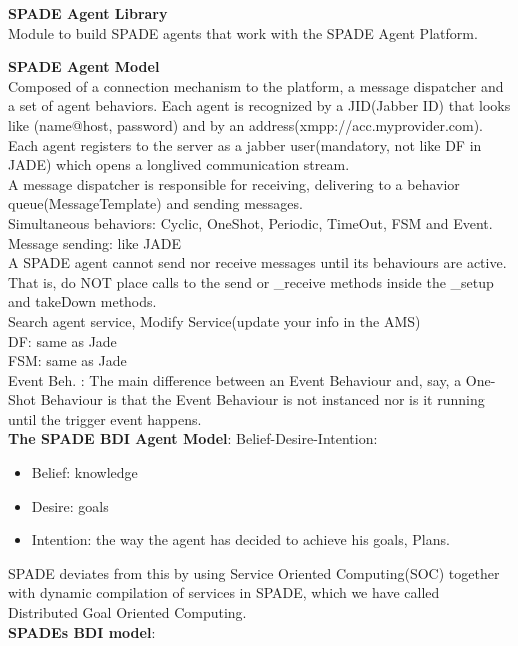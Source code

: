 \documentclass[a4paper, 11pt]{article}
\begin{document}
\textbf{SPADE Agent Library}\\
Module to build SPADE agents that work with the SPADE Agent Platform.

\textbf{SPADE Agent Model}\\
Composed of a connection mechanism to the platform, a message dispatcher and a set of agent behaviors. Each agent is recognized by a JID(Jabber ID) that looks like (name@host, password) and by an address(xmpp://acc.myprovider.com). Each agent registers to the server as a jabber user(mandatory, not like DF in JADE) which opens a longlived communication stream. \\
A message dispatcher is responsible for receiving, delivering to a behavior queue(MessageTemplate) and sending messages. \\
Simultaneous behaviors: Cyclic, OneShot, Periodic, TimeOut, FSM and Event. \\
Message sending: like JADE \\
A SPADE agent cannot send nor receive messages until its behaviours are active. That is, do NOT place calls to the send or \_receive methods inside the \_setup and takeDown methods. \\
Search agent service, Modify Service(update your info in the AMS) \\
DF: same as Jade \\
FSM: same as Jade \\
Event Beh. : The main difference between an Event Behaviour and, say, a One-Shot Behaviour is that the Event Behaviour is not instanced nor is it running until the trigger event happens.\\
\textbf{The SPADE BDI Agent Model}: Belief-Desire-Intention:
\begin{itemize}
	\item Belief: knowledge
	\item Desire: goals
	\item Intention: the way the agent has decided to achieve his goals, Plans.
\end{itemize}
SPADE deviates from this by using Service Oriented Computing(SOC) together with dynamic compilation of services in SPADE, which we have called Distributed Goal Oriented Computing. \\
\textbf{SPADEs BDI model}:
\end{document}
